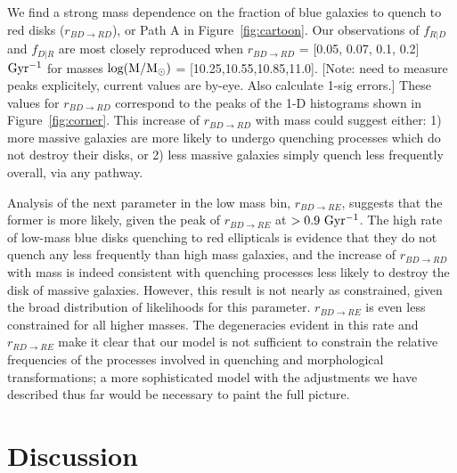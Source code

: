We find a strong mass dependence on the fraction of blue galaxies to quench to red disks ($r_{BD \rightarrow RD}$), or Path A in Figure~\ref{fig:cartoon}. Our observations of $f_{R|D}$ and $f_{D|R}$ are most closely reproduced when $r_{BD \rightarrow RD}$ = [0.05, 0.07, 0.1, 0.2] $\rm Gyr^{-1}$ for masses $\rm log(M/M_{\odot})$ = [10.25,10.55,10.85,11.0]. [Note: need to measure peaks explicitely, current values are by-eye. Also calculate 1-sig errors.] These values for $r_{BD \rightarrow RD}$ correspond to the peaks of the 1-D histograms shown in Figure~\ref{fig:corner}. This increase of $r_{BD \rightarrow RD}$ with mass could suggest either: 1) more massive galaxies are more likely to undergo quenching processes which do not destroy their disks, or 2) less massive galaxies simply quench less frequently overall, via any pathway. 


 Analysis of the next parameter in the low mass bin, $r_{BD\rightarrow RE}$, suggests that the former is more likely, given the peak of $r_{BD \rightarrow RE}$ at $>0.9 ~\rm Gyr^{-1}$. The high rate of low-mass blue disks quenching to red ellipticals is evidence that they do not quench any less frequently than high mass galaxies, and the increase of $r_{BD \rightarrow RD}$ with mass is indeed consistent with quenching processes less likely to destroy the disk of massive galaxies. However, this result is not nearly as constrained, given the broad distribution of likelihoods for this parameter. $r_{BD \rightarrow RE}$ is even less constrained for all higher masses. The degeneracies evident in this rate and $r_{RD \rightarrow RE}$ make it clear that our model is not sufficient to constrain the relative frequencies of the processes involved in quenching and morphological transformations; a more sophisticated model with the adjustments we have described thus far would be necessary to paint the full picture. 



\section{Discussion}
\label{sec:Discussion}

